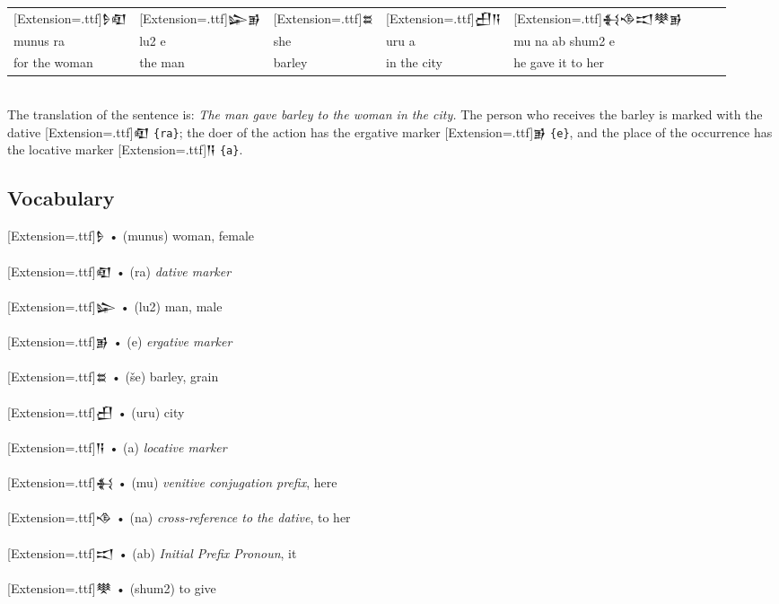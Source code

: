 \documentclass[a4paper,12pt]{book}
\newcommand{\fcn}{\setmainfont{Akkadian}[Extension=.ttf]}
\begin{document}
\noindent
\begin{tabular}[!h]{l l l l l l l l}
  \fcn\Large 𒊩𒊏 &\fcn\Large 𒇽𒂊 &\fcn\Large 𒊺
  &\fcn\Large 𒌷𒀀 &\fcn\Large 𒈬𒈾𒀊𒋧𒂊\\
  munus ra & lu2 e & she & uru a & mu na ab shum2 e\\
  for the woman & the man & barley & in the city
  & he gave it to her\\
\end{tabular}\verb||\\

The translation of the sentence is: {\em
The man gave barley to the woman in the city.}
The person who receives the barley is
marked with the dative {\fcn 𒊏} \verb|{ra}|;
the doer of the action has the ergative
marker {\fcn 𒂊} \verb|{e}|, and the
place of the occurrence has the locative
marker {\fcn 𒀀} \verb|{a}|.

\newpage
\subsection*{Vocabulary}
{\fcn\Large 𒊩} • (munus) woman, female\\
\verb||\\
{\fcn\Large 𒊏} • (ra) {\em dative marker}\\
\verb||\\
{\fcn\Large 𒇽} • (lu2) man, male\\
\verb||\\
{\fcn\Large 𒂊} • (e) {\em ergative marker}\\
\verb||\\
{\fcn\Large 𒊺} • (še) barley, grain\\
\verb||\\
{\fcn\Large 𒌷} • (uru) city\\
\verb||\\
{\fcn\Large 𒀀} • (a) {\em locative marker}\\
\verb||\\
{\fcn\Large 𒈬} • (mu) {\em venitive conjugation prefix}, here\\
\verb||\\
{\fcn\Large 𒈾} • (na) {\em cross-reference to
the dative}, to her\\
\verb||\\
{\fcn\Large 𒀊} • (ab) {\em Initial Prefix Pronoun}, it\\
\verb||\\
{\fcn\Large 𒋧} • (shum2) to give\\


\newpage
\end{document}
